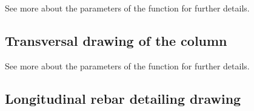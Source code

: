 \documentclass[a4paper,10pt,english]{sphinxmanual}
\begin{document}
\begin{sphinxVerbatim}[commandchars=\\\{\}]
\end{sphinxVerbatim}

\sphinxAtStartPar
See more about the parameters of the {\hyperref[\detokenize{API:etacad.column.Column.draw_longitudinal}]{}} function for further details.


\subsection{Transversal drawing of the column}
\label{\detokenize{usage:transversal-drawing-of-the-column}}
\begin{sphinxVerbatim}[commandchars=\\\{\}]
\end{sphinxVerbatim}

\sphinxAtStartPar
See more about the parameters of the {\hyperref[\detokenize{API:etacad.column.Column.draw_transverse}]{}} function for further details.


\subsection{Longitudinal rebar detailing drawing}
\label{\detokenize{usage:id1}}
\begin{sphinxVerbatim}[commandchars=\\\{\}]
\end{sphinxVerbatim}
\end{document}
